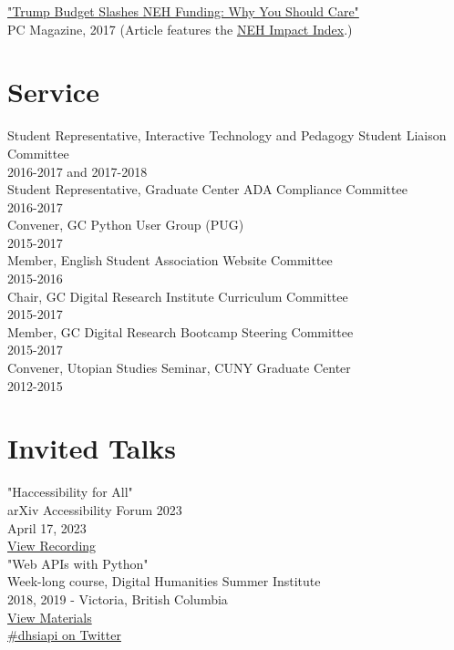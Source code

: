 \documentclass[11pt]{article}
\begin{document}
\href{http://www.pcmag.com/commentary/353904/trump-budget-slashes-neh-funding-why-you-should-care}{"Trump Budget Slashes NEH Funding: Why You Should Care"}\\
PC Magazine, 2017 (Article features the \href{http://www.nehimpact.org/}{NEH Impact Index}.)\\

\section*{Service}
\label{sec:orgheadline7}
Student Representative, Interactive Technology and Pedagogy Student Liaison Committee\\
2016-2017 and 2017-2018\\

Student Representative, Graduate Center ADA Compliance Committee\\
2016-2017\\

Convener, GC Python User Group (PUG)\\
2015-2017\\

Member, English Student Association Website Committee\\
2015-2016\\

Chair, GC Digital Research Institute Curriculum Committee\\
2015-2017\\

Member, GC Digital Research Bootcamp Steering Committee\\
2015-2017\\

Convener, Utopian Studies Seminar, CUNY Graduate Center\\
2012-2015\\
\section*{Invited Talks}
\label{sec:orgheadline8}
"Haccessibility for All"\\
arXiv Accessibility Forum 2023\\
April 17, 2023\\
\href{https://www.youtube.com/watch?v=1v3jFCWQfI8}{View Recording}\\


"Web APIs with Python"\\
Week-long course, Digital Humanities Summer Institute\\
2018, 2019 - Victoria, British Columbia\\
\href{https://github.com/szweibel/DHSI-API-workshop#web-apis-with-python}{View Materials}\\
\href{https://twitter.com/search?q=\%2523dhsiapi&src=typd}{\#dhsiapi on Twitter}\\
\end{document}
